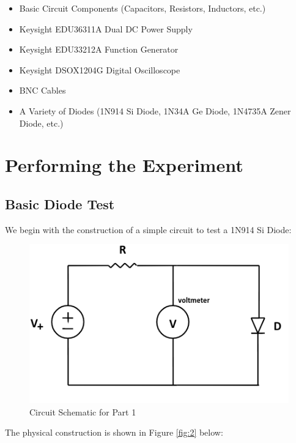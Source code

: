 \documentclass[
	letterpaper, %
	10pt, %
]{CSUniSchoolLabReport}
\begin{document}
\begin{itemize}

  \item Basic Circuit Components (Capacitors, Resistors, Inductors, etc.)

  \item Keysight EDU36311A Dual DC Power Supply

  \item Keysight EDU33212A Function Generator

  \item Keysight DSOX1204G Digital Oscilloscope

  \item BNC Cables

  \item A Variety of Diodes (1N914 Si Diode, 1N34A Ge Diode, 1N4735A Zener Diode, etc.)

\end{itemize}

\newpage

\section{Performing the Experiment}

\subsection{Basic Diode Test}

We begin with the construction of a simple circuit to test a 1N914 Si Diode:

\begin{figure}[H]
  \centering
  \includegraphics[width=.75\textwidth]{Figures/L2F1}
  \caption{Circuit Schematic for Part 1}
  \label{fig:1}
\end{figure}

The physical construction is shown in Figure \ref{fig:2} below:
\end{document}
